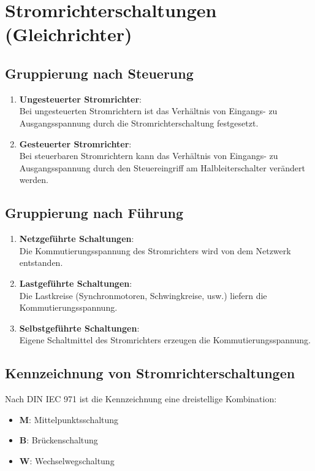 \section{Stromrichterschaltungen (Gleichrichter)}

\subsection{Gruppierung nach Steuerung}
\begin{enumerate}
    \item \textbf{Ungesteuerter Stromrichter}:\\
    Bei ungesteuerten Stromrichtern ist das Verhältnis von Eingangs- zu Ausgangsspannung durch die Stromrichterschaltung festgesetzt.
    \item \textbf{Gesteuerter Stromrichter}:\\
    Bei steuerbaren Stromrichtern kann das Verhältnis von Eingangs- zu Ausgangsspannung durch den Steuereingriff am Halbleiterschalter verändert werden.
\end{enumerate}

\subsection{Gruppierung nach Führung}
\begin{enumerate}
    \item \textbf{Netzgeführte Schaltungen}:\\
    Die Kommutierungsspannung des Stromrichters wird von dem Netzwerk entstanden.
    \item \textbf{Lastgeführte Schaltungen}:\\
    Die Lastkreise (Synchronmotoren, Schwingkreise, usw.) liefern die Kommutierungsspannung.
    \item \textbf{Selbstgeführte Schaltungen}:\\
    Eigene Schaltmittel des Stromrichters erzeugen die Kommutierungsspannung.
\end{enumerate}


\subsection{Kennzeichnung von Stromrichterschaltungen}
Nach DIN IEC 971 ist die Kennzeichnung eine dreistellige Kombination:\\

\begin{itemize}
	\item \textbf{M}: Mittelpunktsschaltung
    \item \textbf{B}: Brückenschaltung
    \item \textbf{W}: Wechselwegschaltung\\
\end{itemize}

